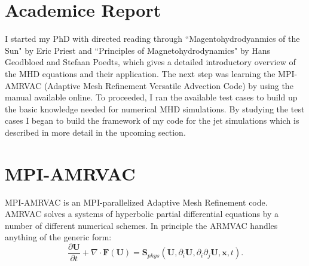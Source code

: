 \documentclass[12pt,a4paper,twoside]{article}
\begin{document}
\section{Academice Report}
I started my PhD with directed reading through ``Magentohydrodyanmics of the Sun" by Eric Priest and ``Principles of Magnetohydrodynamics" by Hans Geodbloed and Stefaan Poedts, which gives a detailed introductory overview of the MHD equations and their application. The next step was learning the MPI-AMRVAC (Adaptive Mesh Refinement Versatile Advection Code) by using the manual available online. To proceeded, I ran the available test cases to build up the basic knowledge needed for numerical MHD simulations. By studying the test cases I began to build the framework of my code for the jet simulations which is described in more detail in the upcoming section.            
\section{MPI-AMRVAC}
MPI-AMRVAC is an MPI-parallelized Adaptive Mesh Refinement code. AMRVAC solves a systems of hyperbolic partial differential equations by a number of different numerical schemes. In principle the ARMVAC handles anything of the generic form: 
\begin{equation}
\frac{\partial \boldsymbol{U}}{\partial t} + \nabla \cdot \boldsymbol{F}(\boldsymbol{U}) = \boldsymbol{S}_{phys} (\boldsymbol{U}, \partial_{i} \boldsymbol{U}, \partial_i \partial_j \boldsymbol{U},\boldsymbol{x},t) .
\end{equation}
\end{document}
